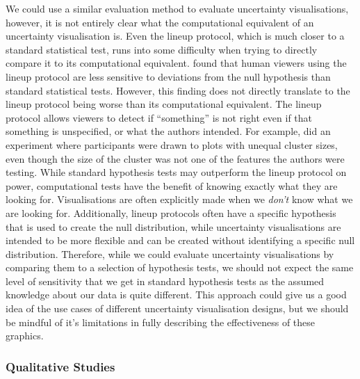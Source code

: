 \documentclass[
  12pt]{article}
\begin{document}
We could use a similar evaluation method to evaluate uncertainty
visualisations, however, it is not entirely clear what the computational
equivalent of an uncertainty visualisation is. Even the lineup protocol,
which is much closer to a standard statistical test, runs into some
difficulty when trying to directly compare it to its computational
equivalent. \citet{Patrick2023} found that human viewers using the
lineup protocol are less sensitive to deviations from the null
hypothesis than standard statistical tests. However, this finding does
not directly translate to the lineup protocol being worse than its
computational equivalent. The lineup protocol allows viewers to detect
if ``something'' is not right even if that something is unspecified, or
what the authors intended. For example, \citet{vanderplas2017} did an
experiment where participants were drawn to plots with unequal cluster
sizes, even though the size of the cluster was not one of the features
the authors were testing. While standard hypothesis tests may outperform
the lineup protocol on power, computational tests have the benefit of
knowing exactly what they are looking for. Visualisations are often
explicitly made when we \emph{don't} know what we are looking for.
Additionally, lineup protocols often have a specific hypothesis that is
used to create the null distribution, while uncertainty visualisations
are intended to be more flexible and can be created without identifying
a specific null distribution. Therefore, while we could evaluate
uncertainty visualisations by comparing them to a selection of
hypothesis tests, we should not expect the same level of sensitivity
that we get in standard hypothesis tests as the assumed knowledge about
our data is quite different. This approach could give us a good idea of
the use cases of different uncertainty visualisation designs, but we
should be mindful of it's limitations in fully describing the
effectiveness of these graphics.

\subsubsection{Qualitative Studies}\label{qualitative-studies}
\end{document}
